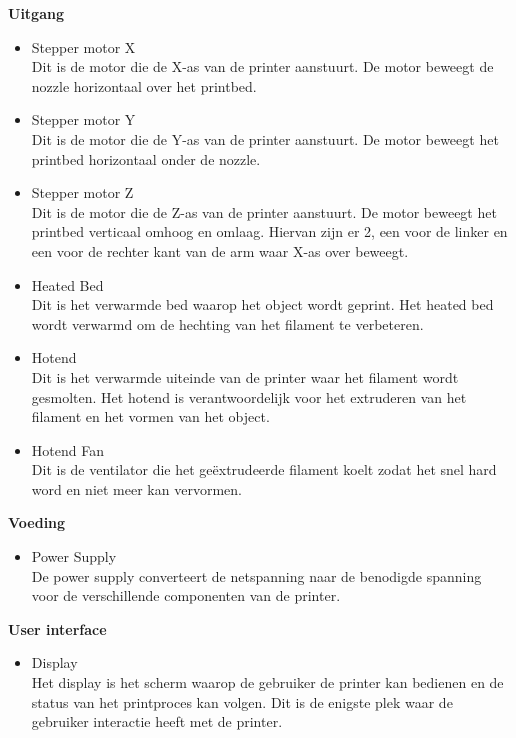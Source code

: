 \documentclass{article}
\begin{document}
\textbf{Uitgang}
\begin{itemize}
  \item Stepper motor X\\
  Dit is de motor die de X-as van de printer aanstuurt. De motor beweegt de nozzle horizontaal over het printbed.
  \item Stepper motor Y\\
  Dit is de motor die de Y-as van de printer aanstuurt. De motor beweegt het printbed horizontaal onder de nozzle.
  \item Stepper motor Z\\
  Dit is de motor die de Z-as van de printer aanstuurt. De motor beweegt het printbed verticaal omhoog en omlaag. Hiervan zijn er 2, een voor de linker en een voor de rechter kant van de arm waar X-as over beweegt.
  \item Heated Bed\\
  Dit is het verwarmde bed waarop het object wordt geprint. Het heated bed wordt verwarmd om de hechting van het filament te verbeteren.
  \item Hotend\\
  Dit is het verwarmde uiteinde van de printer waar het filament wordt gesmolten. Het hotend is verantwoordelijk voor het extruderen van het filament en het vormen van het object.
  \item Hotend Fan\\
  Dit is de ventilator die het geëxtrudeerde filament koelt zodat het snel hard word en niet meer kan vervormen.
\end{itemize}

\textbf{Voeding}
\begin{itemize}
  \item Power Supply\\
  De power supply converteert de netspanning naar de benodigde spanning voor de verschillende componenten van de printer.
\end{itemize}

\textbf{User interface}
\begin{itemize}
  \item Display\\
  Het display is het scherm waarop de gebruiker de printer kan bedienen en de status van het printproces kan volgen. Dit is de enigste plek waar de gebruiker interactie heeft met de printer.
\end{itemize}
\end{document}
